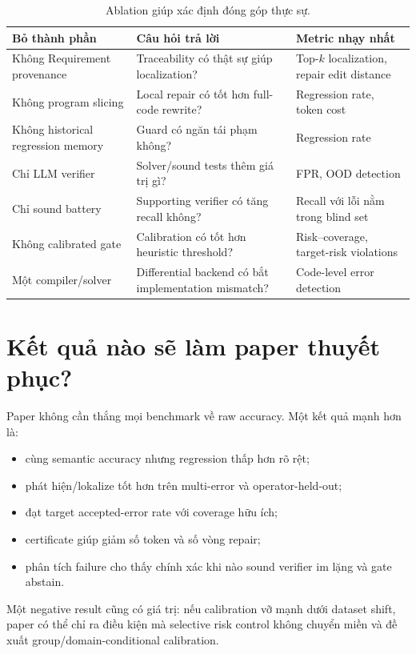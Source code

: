 \documentclass[11pt,a4paper]{article}
\begin{document}
\begin{table}[htbp]
\centering
\caption{Ablation giúp xác định đóng góp thực sự.}
\label{tab:ablations}
\small
\begin{tabularx}{\textwidth}{L{4.4cm} Y Y}
\toprule
\textbf{Bỏ thành phần} & \textbf{Câu hỏi trả lời} & \textbf{Metric nhạy nhất} \\
\midrule
Không Requirement provenance & Traceability có thật sự giúp localization? & Top-\(k\) localization, repair edit distance \\
Không program slicing & Local repair có tốt hơn full-code rewrite? & Regression rate, token cost \\
Không historical regression memory & Guard có ngăn tái phạm không? & Regression rate \\
Chỉ LLM verifier & Solver/sound tests thêm giá trị gì? & FPR, OOD detection \\
Chỉ sound battery & Supporting verifier có tăng recall không? & Recall với lỗi nằm trong blind set \\
Không calibrated gate & Calibration có tốt hơn heuristic threshold? & Risk--coverage, target-risk violations \\
Một compiler/solver & Differential backend có bắt implementation mismatch? & Code-level error detection \\
\bottomrule
\end{tabularx}
\end{table}

\section{Kết quả nào sẽ làm paper thuyết phục?}

Paper không cần thắng mọi benchmark về raw accuracy. Một kết quả mạnh hơn là:

\begin{itemize}
  \item cùng semantic accuracy nhưng regression thấp hơn rõ rệt;
  \item phát hiện/lokalize tốt hơn trên multi-error và operator-held-out;
  \item đạt target accepted-error rate với coverage hữu ích;
  \item certificate giúp giảm số token và số vòng repair;
  \item phân tích failure cho thấy chính xác khi nào sound verifier im lặng và gate abstain.
\end{itemize}

Một negative result cũng có giá trị: nếu calibration vỡ mạnh dưới dataset shift, paper có thể chỉ ra điều kiện mà selective risk control không chuyển miền và đề xuất group/domain-conditional calibration.
\end{document}
